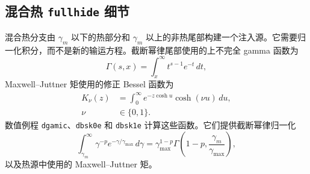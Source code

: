 \documentclass[twocolumn]{aastex702}
\begin{document}
\subsection{混合热 \texttt{fullhide} 细节}

混合热分支由 \(\gamma_m\) 以下的热部分和 \(\gamma_m\) 以上的非热尾部构建一个注入源。它需要归一化积分，而不是新的输运方程。截断幂律尾部使用的上不完全 gamma 函数为
\begin{equation}
\Gamma(s,x)=\int_x^\infty t^{s-1}e^{-t}\,dt,
\end{equation}
Maxwell--Juttner 矩使用的修正 Bessel 函数为
\begin{equation}
\begin{aligned}
K_\nu(z)&=\int_0^\infty e^{-z\cosh u}\cosh(\nu u)\,du,\\
\nu&\in\{0,1\}.
\end{aligned}
\end{equation}
数值例程 \texttt{dgamic}、\texttt{dbsk0e} 和 \texttt{dbsk1e} 计算这些函数。它们提供截断幂律归一化
\begin{equation}
\int_{\gamma_m}^{\infty}\gamma^{-p}e^{-\gamma/\gamma_{\max}}\,d\gamma
=\gamma_{\max}^{1-p}
\Gamma\!\left(1-p,\frac{\gamma_m}{\gamma_{\max}}\right),
\end{equation}
以及热源中使用的 Maxwell--Juttner 矩。
\end{document}

